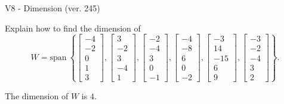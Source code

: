 \begin{exercise}
  \begin{exerciseTitle}V8 - Dimension (ver. 245)\end{exerciseTitle}
  \begin{exerciseStatement}
    Explain how to find the dimension of 
\[W=\mathrm{span}\ \left\{\left[\begin{array}{r}
-4 \\
-2 \\
0 \\
1 \\
3
\end{array}\right] , \left[\begin{array}{r}
3 \\
-2 \\
3 \\
-4 \\
1
\end{array}\right] , \left[\begin{array}{r}
-2 \\
-4 \\
3 \\
0 \\
-1
\end{array}\right] , \left[\begin{array}{r}
-4 \\
-8 \\
6 \\
0 \\
-2
\end{array}\right] , \left[\begin{array}{r}
-3 \\
14 \\
-15 \\
6 \\
9
\end{array}\right] , \left[\begin{array}{r}
-3 \\
-2 \\
-4 \\
3 \\
2
\end{array}\right]\right\}.\]



  \end{exerciseStatement}
  \begin{exerciseAnswer}
   The dimension of \(W\) is  \(4\).
  


  \end{exerciseAnswer}
\end{exercise}